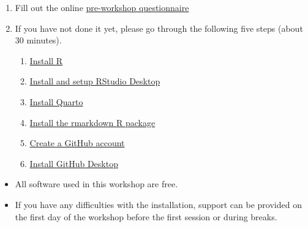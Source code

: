 \documentclass[
  letterpaper,
  DIV=11,
  numbers=noendperiod]{scrartcl}
\providecommand{\tightlist}{%
  \setlength{\itemsep}{0pt}\setlength{\parskip}{0pt}}\usepackage{longtable,booktabs,array}
\begin{document}
\begin{enumerate}
\def\labelenumi{\arabic{enumi}.}
\item
  Fill out the online
  \href{https://timicodktest.smartforest.de/-/single/cac06e76b3e163e655e49626f8129de8f55a8035ced54f15bc4c6cf527dba8a7?st=DnBRz677PIYh33ML0rE1amWzyhCIYPGFQnmZ6AAou8nJFyikWN6nLM5i3G4I0YZN}{pre-workshop
  questionnaire}
\item
  If you have not done it yet, please go through the following five
  steps (about 30 minutes).

  \begin{enumerate}
  \def\labelenumii{\alph{enumii}.}
  \item
    \href{https://thaliehln.github.io/ds4ph/r_setup.html\#sec-R-installation}{Install
    R}
  \item
    \href{https://thaliehln.github.io/ds4ph/r_setup.html\#sec-RStudio-installation}{Install
    and setup RStudio Desktop}
  \item
    \href{https://thaliehln.github.io/ds4ph/r_setup.html\#sec-Quarto-installation}{Install
    Quarto}
  \item
    \href{https://thaliehln.github.io/ds4ph/r_setup.html\#sec-rmarkdown-installation}{Install
    the rmarkdown R package}
  \item
    \href{https://thaliehln.github.io/ds4ph/github_setup.html\#sec-GitHub-account-creation}{Create
    a GitHub account}
  \item
    \href{https://thaliehln.github.io/ds4ph/github_setup.html\#sec-GitHub-Desktop-installation}{Install
    GitHub Desktop}
  \end{enumerate}
\end{enumerate}

\begin{tcolorbox}[enhanced jigsaw, coltitle=black, bottomrule=.15mm, toptitle=1mm, colframe=quarto-callout-note-color-frame, colback=white, bottomtitle=1mm, rightrule=.15mm, opacityback=0, breakable, leftrule=.75mm, opacitybacktitle=0.6, left=2mm, titlerule=0mm, toprule=.15mm, title=\textcolor{quarto-callout-note-color}{\faInfo}\hspace{0.5em}{Note}, arc=.35mm, colbacktitle=quarto-callout-note-color!10!white]

\begin{itemize}
\tightlist
\item
  All software used in this workshop are free.
\item
  If you have any difficulties with the installation, support can be
  provided on the first day of the workshop before the first session or
  during breaks.
\end{itemize}

\end{tcolorbox}
\end{document}
